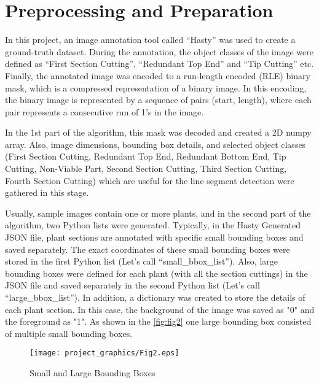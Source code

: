 \documentclass[]{iat}
\begin{document}
\section{Preprocessing and Preparation}
In this project, an image annotation tool called “Hasty” was used to create a ground-truth dataset. During the annotation, the object classes of the image were defined as “First Section Cutting”, “Redundant Top End” and “Tip Cutting” etc. Finally, the annotated image was encoded to a run-length encoded (RLE) binary mask, which is a compressed representation of a binary image. In this encoding, the binary image is represented by a sequence of pairs (start, length), where each pair represents a consecutive run of 1's in the image. 
\par
In the 1st part of the algorithm, this mask was decoded and created a 2D numpy array. Also, image dimensions, bounding box details, and selected object classes (First Section Cutting, Redundant Top End, Redundant Bottom End, Tip Cutting, Non-Viable Part, Second Section Cutting, Third Section Cutting, Fourth Section Cutting) which are useful for the line segment detection were gathered in this stage.
\par
Usually, sample images contain one or more plants, and in the second part of the algorithm, two Python lists were generated. Typically, in the Hasty Generated JSON file, plant sections are annotated with specific small bounding boxes and saved separately. The exact coordinates of these small bounding boxes were stored in the first Python list (Let’s call “small\_bbox\_list”). Also, large bounding boxes were defined for each plant (with all the section cuttings) in the JSON file and saved separately in the second Python list (Let’s call “large\_bbox\_list”). In addition, a dictionary was created to store the details of each plant section. In this case, the background of the image was saved as "0" and the foreground as "1". As shown in the  \autoref{fig:fig2} one large bounding box consisted of multiple small bounding boxes. 
\par
\FloatBarrier
\begin{figure}[h]
    
	\texttt{[image: project\_graphics/Fig2.eps]}
	\caption{Small and Large Bounding Boxes}
	\label{fig:fig2}
\end{figure}
\end{document}
